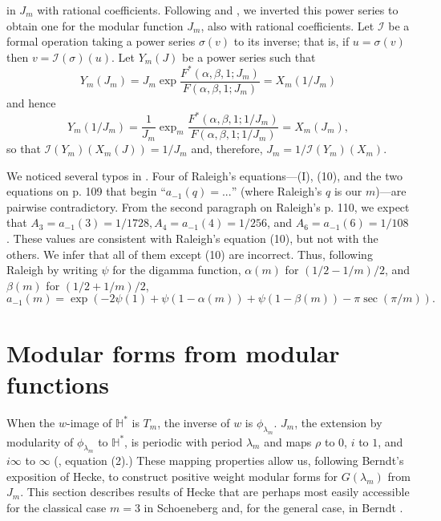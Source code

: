 \documentclass{article}
\begin{document}
in $J_m$ with rational coefficients.
Following \cite{lehner1954note} and
 \cite{raleigh1962fourier},
we inverted this power series to obtain
one for the modular function $J_m$,
also with rational coefficients.
Let $\mathscr{I}$
be a formal operation
taking a power series $\sigma(v)$
to its inverse; that is,
if $u=\sigma(v)$ then 
$v = \mathscr{I}(\sigma)(u)$.
Let  $Y_m(J)$ be a power series
such that
$$ Y_m(J_m) = J_m \exp 
\frac {F^*(\alpha, \beta, 1;J_m)}
{F(\alpha, \beta, 1;J_m)} = 
X_m \left (1/J_m \right )$$
and hence
$$
Y_m(1/J_m) =
\frac 1{J_m} \exp _m
\frac {F^*(\alpha, \beta, 1;1/J_m)}
{F(\alpha, \beta, 1;1/J_m)} = X_m(J_m),$$
so that $\mathscr{I}(Y_m)(X_m(J)) = 1/J_m$
and, therefore,
 $J_m = 1/\mathscr{I}(Y_m)(X_m)$.
\begin{remark}
We noticed several typos in
\cite{raleigh1962fourier}.
Four of Raleigh's equations---(I), (10), and
the two equations on p. 109
that begin ``$a_{-1}(q) = ...$''
(where Raleigh's $q$ is our $m$)---are 
pairwise contradictory.
From the second paragraph
on Raleigh's p. 110, we expect that 
$A_3 = a_{-1}(3) = 1/1728, A_4 = a_{-1}(4) = 1/256$, and 
$A_6 = a_{-1}(6) = 1/108$. These values
are consistent with Raleigh's equation 
(10), but not with the others.
We infer that all of them except (10) are incorrect.
Thus, following Raleigh by
writing  $\psi$ for the digamma function,
$\alpha(m)$ for $(1/2-1/m)/2$, and 
$\beta(m)$ for $(1/2+1/m)/2$, 
\begin{equation}
a_{-1}(m) = \exp\left (-2 \psi(1) + \psi(1-\alpha(m))
+\psi(1 - \beta(m))- \pi \sec(\pi/m)
\right ).
\end{equation}
\end{remark}
\section{Modular forms 
from modular functions}
When the  
$w$-image of $\mathbb{H}^*$ is
$T_m$, the inverse of $w$ is
$\phi_{\lambda_m}$. 
$J_m$, the extension 
by modularity of $\phi_{\lambda_m}$ to
$\mathbb{H}^*$, is periodic
with period $\lambda_m$ and
maps $\rho$ to $0$, $i$ to $1$, 
and $i\infty$ to $\infty$
(\cite{lehner1954note},
equation (2).)
These mapping properties
allow us, following Berndt's exposition
\cite{berndt2008hecke}
of Hecke,
to construct positive 
weight modular forms for $G(\lambda_m)$
from $J_m$.
This section describes results of Hecke
that are perhaps most easily accessible
for the classical case $m = 3$ 
in Schoeneberg
\cite{schoeneberg1974} and, 
for the general case, in 
 Berndt  \cite{berndt2008hecke}.
\end{document}
